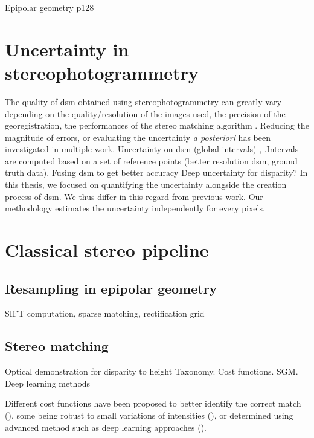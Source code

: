 
Epipolar geometry p128 \cite{cnes_imagerie_2008}

\section{Uncertainty in stereophotogrammetry}
The quality of \acrshort{dsm} obtained using stereophotogrammetry can greatly vary depending on the quality/resolution of the images used, the precision of the georegistration, the performances of the stereo matching algorithm \etc. Reducing the magnitude of errors, or evaluating the uncertainty \textit{a posteriori} has been investigated in multiple work.
Uncertainty on \acrshort{dsm} (global intervals) \cite{hugonnet_uncertainty_2022, deschamps-berger_apport_2021, wang_robust_2015}, \cite{oksanen_digital_2006} \cite{panagiotakis_validation_2018}.Intervals are computed based on a set of reference points (better resolution \acrshort{dsm}, ground truth data).
Fusing \acrshort{dsm} to get better accuracy \cite{qin_uncertainty-guided_2022}
\cite{hu_quantitative_2012,poggi_confidence_2021}
Deep uncertainty for disparity?
In this thesis, we focused on quantifying the uncertainty alongside the creation process of \acrshort{dsm}. We thus differ in this regard from previous work. Our methodology estimates the uncertainty independently for every pixels, 

\section{Classical stereo pipeline}\label{sec:classical_stero_pipeline}
\subsection{Resampling in epipolar geometry}
SIFT computation, sparse matching, rectification grid

\subsection{Stereo matching}
Optical demonstration for disparity to height
Taxonomy. Cost functions. SGM. Deep learning methods

Different cost functions have been proposed to better identify the correct match (\cite{hannah_computer_1994}), some being robust to small variations of intensities (\cite{zabih_non-parametric_1994}), or determined using advanced method such as deep learning approaches (\cite{zbontar_stereo_2016, laga_survey_2022}).

